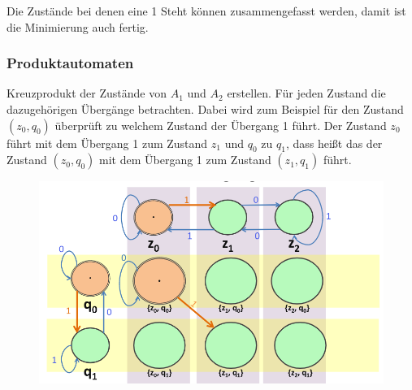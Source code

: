\documentclass[12pt,a4paper]{article}
\begin{document}
Die Zustände bei denen eine 1 Steht können zusammengefasst werden, damit ist die Minimierung auch fertig.

\subsubsection{Produktautomaten}

Kreuzprodukt der Zustände von $A_1$ und $A_2$ erstellen. \newline
Für jeden Zustand die dazugehörigen Übergänge betrachten.\newline
Dabei wird zum Beispiel für den Zustand $(z_0, q_0)$ überprüft zu welchem Zustand der Übergang 1 führt. Der Zustand $z_0$ führt mit dem Übergang 1 zum Zustand $z_1$ und $q_0$ zu $q_1$, dass heißt das der Zustand $(z_0, q_0)$ mit dem Übergang 1 zum Zustand $(z_1, q_1)$ führt.\newline
\begin{center}
	\begin{figure}[!h]
		\includegraphics[width=\textwidth]{Bilder/ProduktautomatUbergang.png}
	\end{figure}
\end{center}
  
\end{document}
